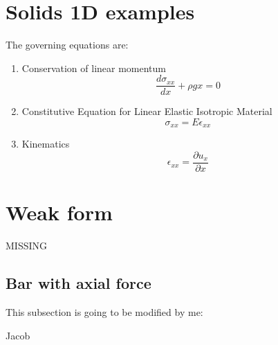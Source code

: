 \documentclass[letterpaper,11pt]{article}
\begin{document}
\section{Solids 1D examples}

The governing equations are:

\begin{enumerate}
\item Conservation of linear momentum
\begin{equation}
\frac{d \sigma_{xx}}{dx} + \rho g x = 0
\end{equation}
\item Constitutive Equation for Linear Elastic Isotropic Material
\begin{equation}
\sigma_{xx} = E \epsilon_{xx}
\end{equation}
\item Kinematics
\begin{equation}
\epsilon_{xx} = \frac{\partial u_x}{\partial x}
\end{equation}
\end{enumerate}

\section{Weak form}

MISSING

\subsection{Bar with axial force}


This subsection is going to be modified by me:

\huge{Jacob}
\end{document}
